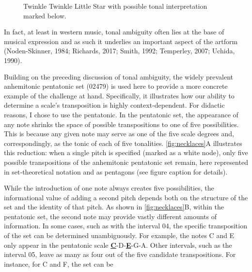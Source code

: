 \documentclass[10pt,twocolumn]{article}
\numberwithin{equation}{section} %
\begin{document}
\begin{figure}[htbp]
    \centering
    \caption{Twinkle Twinkle Little Star with possible tonal interpretation marked below.}
    \label{fig:twinkle}
\end{figure}

In fact, at least in western music, tonal ambiguity often lies at
the base of musical expression and as such it underlies an important aspect of
the artform (Noden-Skinner,
1984; Richards, 2017; Smith, 1992; Temperley, 2007; Uchida, 1990).

Building on the
preceding discussion of tonal ambiguity, the widely prevalent anhemitonic
pentatonic set (02479) is used here to provide a more concrete example of the
challenge at hand. Specifically, it illustrates how our ability to determine a
scale’s transposition is highly context‑dependent. For didactic reasons, I chose to use the pentatonic. In the
pentatonic set, the appearance of any note shrinks the space of possible
transpositions to one of five possibilities. This is because any given note may
serve as one of the five scale degrees and, correspondingly, as the tonic of
each of five tonalities. \autoref{fig:necklaces}A illustrates this reduction: when a
single pitch is specified (marked as a white node), only five possible
transpositions of the anhemitonic pentatonic set remain, here represented in
set‑theoretical
notation and as pentagons (see figure caption for details).

While the
introduction of one note always creates five possibilities, the informational
value of adding a second pitch depends both on the structure of the set and the
identity of that pitch. As shown in \autoref{fig:necklaces}B, within the pentatonic set, the second
note may provide vastly different amounts of information. In some cases, such
as with the interval 04, the specific transposition of the set can be
determined unambiguously. For example, the notes C and E only appear in the
pentatonic scale \textbf{\uline{C}}-D-\textbf{\uline{E}}-G-A. Other intervals, such
as the interval 05, leave as many as four out of the five candidate
transpositions. For instance, for C and F, the set can be
\end{document}
